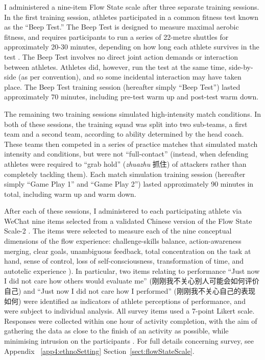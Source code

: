 \begin{CJK}{UTF8}{gbsn}
I administered a nine-item Flow State scale \citep{Jackson2002} after three separate training sessions.  In the first training session, athletes participated in a common fitness test known as the ``Beep Test.''  The Beep Test is designed to measure maximal aerobic fitness, and requires participants to run a series of 22-metre shuttles for approximately 20-30 minutes, depending on how long each athlete survives in the test \citep[see][]{Stickland2003}.  The Beep Test involves no direct joint action demands or interaction between athletes.  Athletes did, however, run the test at the same time, side-by-side (as per convention), and so some incidental interaction may have taken place.  The Beep Test training session (hereafter simply ``Beep Test'') lasted approximately 70 minutes, including pre-test warm up and post-test warm down.

The remaining two training sessions simulated high-intensity match conditions. In both of these sessions, the training squad was split into two sub-teams, a first team and a second team, according to ability determined by the head coach.  These teams then competed in a series of practice matches that simulated match intensity and conditions, but were not ``full-contact'' (instead, when defending athletes were required to ``grab hold'' (\textit{zhuazhu} 抓住) of attackers rather than completely tackling them).  Each match simulation training session (hereafter simply ``Game Play 1'' and ``Game Play 2'') lasted approximately 90 minutes in total, including warm up and warm down.

After each of these sessions, I administered to each participating athlete via WeChat nine items selected from a validated Chinese version \citep{Liu2012} of the Flow State Scale-2 \citep{Jackson2002}.  The items were selected to measure each of the nine conceptual dimensions of the flow experience: challenge-skills balance, action-awareness merging, clear goals, unambiguous feedback, total concentration on the task at hand, sense of control, loss of self-consciousness, transformation of time, and autotelic experience \citep{Csikszentmihalyi1990}).  In particular, two items relating to performance ``Just now I did not care how others would evaluate me'' (刚刚我不关心别人可能会如何评价自己) and ``Just now I did not care how I performed'' (刚刚我不关心自己的表现如何) were identified as indicators of athlete perceptions of performance, and were subject to individual analysis. All survey items used a 7-point Likert scale.  Responses were collected within one hour of activity completion, with the aim of gathering the data as close to the finish of an activity as possible, while minimising intrusion on the participants \citep{Jackson2004}. For full details concerning survey, see Appendix ~\ref{app4:ethnoSetting} Section~\ref{sect:flowStateScale}.


\end{CJK}
